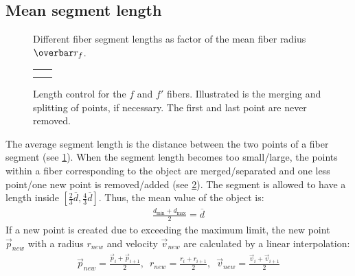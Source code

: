 \subsection{Mean segment length}
%
\begin{figure}[!t]
    \centering
    \setlength{\tikzwidth}{0.75\textwidth}
	\caption{Different fiber segment lengths as factor of the mean fiber radius $\fiberRadiusMean$.}
	\label{fig:modelLength}
\end{figure}
%
\begin{figure}[!t]
    \centering
    \tikzset{external/export=false}
    \def\forcetikzscale{true}
    \setlength{\tabcolsep}{0pt}
    \setlength{\tikzwidth}{.45\textwidth}
    \begin{tabular}{C{.5\textwidth}C{.5\textwidth}}
     &
     \\
     &
    \end{tabular}
	\caption{Length control for the $f$ and $f'$ fibers. Illustrated is the merging and splitting of points, if necessary. The first and last point are never removed.}
	\label{fig:mergeSplit}
\end{figure}
%
The average segment length is the distance between the two points of a fiber segment (see \cref{fig:modelLength}).
When the segment length becomes too small/large, the points within a fiber corresponding to the object are merged/separated and one less point/one new point is removed/added (see \cref{fig:mergeSplit}).
The segment is allowed to have a length inside $[\frac{2}{3} \overline{d},\frac{4}{3} \overline{d}]$. 
Thus, the mean value of the object is:
\begin{align}
\frac{d_{\min} + d_{\max}}{2} = \overline{d}
\end{align}
%
If a new point is created due to exceeding the maximum limit, the new point $\vec{p}_{new}$ with a radius $r_{new}$ and velocity $\vec{v}_{new}$ are calculated by a linear interpolation:
\begin{align}
\vec{p}_{new} = \frac{\vec{p}_{i} + \vec{p}_{i+1}}{2},\enspace
r_{new} = \frac{r_{i} + r_{i+1}}{2},\enspace
\vec{v}_{new} = \frac{\vec{v}_{i} + \vec{v}_{i+1}}{2}
\end{align}
%
% 
% 

